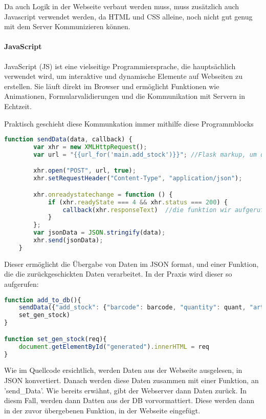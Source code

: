 Da auch Logik in der Webseite verbaut werden muss, muss zusätzlich auch Javascript verwendet werden, da HTML und CSS alleine, noch nicht gut genug mit dem Server Kommunizieren können.

\paragraph{JavaScript}
JavaScript (JS) ist eine vielseitige Programmiersprache, die hauptsächlich verwendet wird, um interaktive und dynamische Elemente auf Webseiten zu erstellen. Sie läuft direkt im Browser und ermöglicht Funktionen wie Animationen, Formularvalidierungen und die Kommunikation mit Servern in Echtzeit.

Praktisch geschieht diese Kommunkation immer mithilfe diese Programmblocks

\begin{lstlisting}[language=JavaScript]
    function sendData(data, callback) {
        var xhr = new XMLHttpRequest();
        var url = "{{url_for('main.add_stock')}}"; //Flask markup, um die richtige url zu erreichen, dies wird vor ausgabe auf der Webseite noch eingesetzt

        xhr.open("POST", url, true);
        xhr.setRequestHeader("Content-Type", "application/json");

        xhr.onreadystatechange = function () {
            if (xhr.readyState === 4 && xhr.status === 200) {
                callback(xhr.responseText)  //die funktion wir aufgerufen
            }
        };
        var jsonData = JSON.stringify(data);
        xhr.send(jsonData);
    }
\end{lstlisting}

Dieser ermöglicht die Übergabe von Daten im JSON format, und einer Funktion, die die zurückgeschickten Daten verarbeitet. In der Praxis wird dieser so aufgerufen:

\begin{lstlisting}[language=JavaScript]
function add_to_db(){
    sendData({"add_stock": {"barcode": barcode, "quantity": quant, "article": article}}, 
    set_gen_stock)
}

function set_gen_stock(req){
    document.getElementById("generated").innerHTML = req
}\end{lstlisting}

Wie im Quellcode ersichtlich, werden Daten aus der Webseite ausgelesen, in JSON konvertiert. Danach werden diese Daten zusammen mit einer Funktion, an 'send\_Data'. Wie bereits erwähnt, gibt der Webserver dann Daten zurück. In diesm Fall, werden dann Datten aus der DB vorvormattiert. Diese werden dann in der zuvor übergebenen Funktion, in der Webseite eingefügt.

